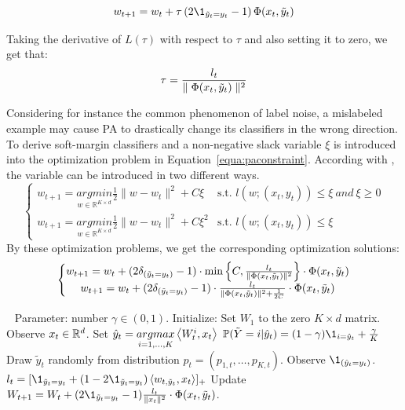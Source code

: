 \begin{equation}
\label{equa:BPAupdate}
w_{t+1} = w_t + \tau \left(2\1_{\tilde{y}_t = y_t}-1\right) \Phi(x_t,\tilde{y}_t)
\end{equation}

Taking the derivative of $L(\tau)$ with respect to $\tau$ and also setting it to zero, we get that:
\[ \tau = \frac{l_t}{\parallel{\Phi(x_t,\tilde{y}_t)}\parallel^2}\]

Considering for instance the common phenomenon of label noise, a mislabeled example may cause PA to drastically change its classifiers in the wrong direction. To derive soft-margin classifiers \cite{vapnik1998statistical} and a non-negative slack variable $\xi$ is introduced into the optimization problem in Equation~\ref{equa:paconstraint}. According with \cite{crammer2006online}, the variable can be introduced in two different ways.
\[
\left\{
\begin{matrix}
w_{t+1} = \underset{w\in \mathbb{R}^{K\times d}}{argmin}\frac{1}{2}\parallel{w-w_t}\parallel^2 + C\xi    & \text{s.t.  }  l(w;(x_t,y_t))\leqslant \xi \ and\ \xi \geqslant 0 \\ 
w_{t+1} = \underset{w\in \mathbb{R}^{K\times d}}{argmin}\frac{1}{2}\parallel{w-w_t}\parallel^2 + C\xi^2 & \text{s.t.  }  l(w;(x_t,y_t))\leqslant \xi
\end{matrix}
\right.
\]
By these optimization problems, we get the corresponding optimization solutions:
\[
\left\{
\begin{matrix}
w_{t+1} = w_t + (2 \delta_{(\tilde{y}_t =y_t)}-1)\cdot \text{min}\left\{C, \frac{l_t}{\parallel{\Phi(x_t,\tilde{y}_t)}\parallel^2}\right\} \cdot \Phi(x_t,\tilde{y}_t) \\
w_{t+1} = w_t + (2 \delta_{(\tilde{y}_t =y_t)}-1)\cdot \frac{l_t}{\parallel{\Phi(x_t,\tilde{y}_t)}\parallel^2+\frac{1}{2C}} \cdot \Phi(x_t,\tilde{y}_t)
\end{matrix}
\right.
\]

\begin{algo}
\begin{algorithmic}
\STATE $\ \ $
\STATE Parameter: number $\gamma\in \left(0,1\right)$.
\STATE Initialize: Set $W_1$ to the zero $K \times d$ matrix.
	\STATE Observe $x_t \in \mathbb{R}^d$.
    \STATE Set $\hat{y}_t = \underset{i = 1,\dots,K}{argmax}\left\langle W_t^i ,x_t\right\rangle$
    	\STATE $\mathbb{P}(\tilde{Y} = i | \hy) = (1-\gamma)\1_{i = \hy} + \frac{\gamma}{K}$
    \ENDFOR
    \STATE Draw $\tilde{y}_t$ randomly from distribution $p_t = \left(p_{1,t},\dots ,p_{K,t}\right)$.
    \STATE Observe $\1_{(\hy=y_t)}$.
    \STATE $l_t = [\1_{\ty=y_t}+(1-2\1_{\tilde{y}_t=y_t})\left\langle w_{t,\tilde{y}_t},x_t\right\rangle]_{+}$
    \STATE Update $W_{t+1} = W_t + (2\1_{\tilde{y}_t=y_t}-1)\frac{l_t}{\parallel{x_t}\parallel^2}\cdot\Phi(x_t,\tilde{y}_t)$.
\ENDFOR
\end{algorithmic}
\end{algo}
